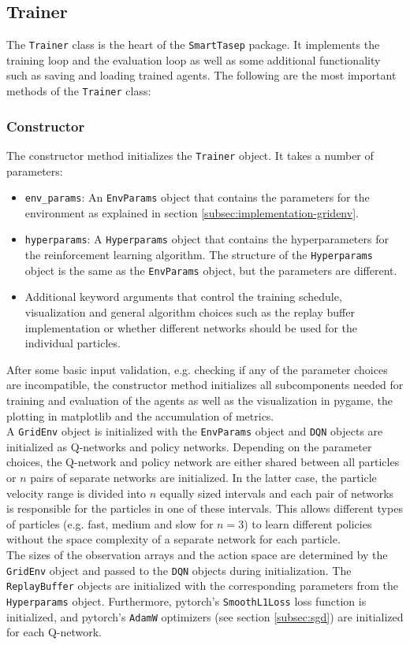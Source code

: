 \subsection{Trainer}
\label{subsec:implementation-trainer}
The \texttt{Trainer} class is the heart of the \texttt{SmartTasep} package. It implements the training loop and the evaluation loop as well as some additional functionality such as saving and loading trained agents. The following are the most important methods of the \texttt{Trainer} class:

\subsubsection{Constructor}
The constructor method initializes the \texttt{Trainer} object. It takes a number of parameters:
\begin{itemize}
    \item \texttt{env\_params}: An \texttt{EnvParams} object that contains the parameters for the environment as explained in section \ref{subsec:implementation-gridenv}.
    \item \texttt{hyperparams}: A \texttt{Hyperparams} object that contains the hyperparameters for the reinforcement learning algorithm. The structure of the \texttt{Hyperparams} object is the same as the \texttt{EnvParams} object, but the parameters are different.
    \item Additional keyword arguments that control the training schedule, visualization and general algorithm choices such as the replay buffer implementation or whether different networks should be used for the individual particles.
\end{itemize}
After some basic input validation, e.g. checking if any of the parameter choices are incompatible, the constructor method initializes all subcomponents needed for training and evaluation of the agents as well as the visualization in pygame, the plotting in matplotlib and the accumulation of metrics.
\\
A \texttt{GridEnv} object is initialized with the \texttt{EnvParams} object and \texttt{DQN} objects are initialized as Q-networks and policy networks. Depending on the parameter choices, the Q-network and policy network are either shared between all particles or $n$ pairs of separate networks are initialized. In the latter case, the particle velocity range is divided into $n$ equally sized intervals and each pair of networks is responsible for the particles in one of these intervals. This allows different types of particles (e.g. fast, medium and slow for $n=3$) to learn different policies without the space complexity of a separate network for each particle.
\\
The sizes of the observation arrays and the action space are determined by the \texttt{GridEnv} object and passed to the \texttt{DQN} objects during initialization. The \texttt{ReplayBuffer} objects are initialized with the corresponding parameters from the \texttt{Hyperparams} object. Furthermore, pytorch's \texttt{SmoothL1Loss} loss function is initialized, and pytorch's \texttt{AdamW} optimizers (see section \ref{subsec:sgd}) are initialized for each Q-network. 


